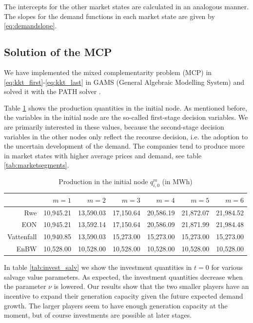 The intercepts for the other market states are calculated in an analogous manner. The slopes for the demand functions in each market state are given by \eqref{eq:demandslope}.

\subsection{Solution of the MCP}

We have implemented the mixed complementarity problem (MCP) in \eqref{eq:kkt_first}-\eqref{eq:kkt_last} in GAMS (General Algebraic Modelling System) and solved it with the PATH solver \citep[see][]{Ferris2000}.

Table \ref{tab:prod_init} shows the production quantities in the initial node. As mentioned before, the variables in the initial node are the so-called first-stage decision variables. We are primarily interested in these values, because the second-stage decision variables in the other nodes only reflect the recourse decision, i.e. the adoption to the uncertain development of the demand. The companies tend to produce more in market states with higher average prices and demand, see table \ref{tab:marketsegments}. 

\begin{table}[htb]
  \centering
  \caption{Production in the initial node $q_{i,0}^{m}$ (in MWh)}
  \label{tab:prod_init}
  \vspace{0.3cm}
  \begin{tabular}{rrrrrrr}
\hline
           &     $m=1$ &     $m=2$ &     $m=3$ &     $m=4$ &     $m=5$ &     $m=6$ \\
\hline\hline
       Rwe &    10,945.21  &    13,590.03  &    17,150.64  &    20,586.19  &    21,872.07  &    21,984.52  \\

       EON &    10,945.21  &    13,592.14  &    17,150.64  &    20,586.09  &    21,871.99  &    21,984.48  \\

    Vattenfall &    10,940.85  &    13,590.03  &    15,273.00  &    15,273.00  &    15,273.00  &    15,273.00  \\

      EnBW &    10,528.00  &    10,528.00  &    10,528.00  &    10,528.00  &    10,528.00  &    10,528.00  \\
\hline
  \end{tabular}
\end{table}

In table \ref{tab:invest_salv} we show the investment quantities in $t=0$ for various salvage value parameters. As expected, the investment quantities decrease when the parameter $\nu$ is lowered. Our results show that the two smaller players have an incentive to expand their generation capacity given the future expected demand growth. The larger players seem to have enough generation capacity at the moment, but of course investments are possible at later stages.

